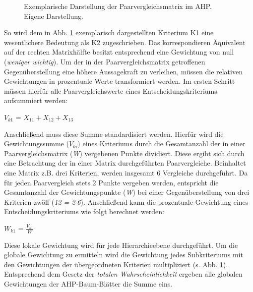 \begin{center}
	\begin{figure}[H]
		\centering
		\caption[Exemplarische Darstellung der Paarvergleichsmatrix im AHP]{Exemplarische Darstellung der Paarvergleichsmatrix im AHP.\\ Eigene Darstellung.}
		\label{fig:AHP_B}
	\end{figure}
\end{center}
\vspace*{-10mm}
So wird dem in Abb. \ref*{fig:AHP_B} exemplarisch dargestellten Kriterium K1 eine wesentlichere Bedeutung als K2 zugeschrieben. Das korrespondieren Äquivalent auf der rechten Matrixhälfte besitzt entsprechend eine Gewichtung von null (\textit{weniger wichtig}). Um der in der Paarvergleichsmatrix getroffenen Gegenüberstellung eine höhere Aussagekraft zu verleihen, müssen die relativen Gewichtungen in prozentuale Werte transformiert werden. Im ersten Schritt müssen hierfür alle Paarvergleichswerte eines Entscheidungskriteriums aufsummiert werden:\\
 \vspace{-6mm}
 \begin{center}
	$V_{k1}$ = $X_{11}+X_{12}+X_{13}$	
 \end{center}
Anschließend muss diese Summe standardisiert werden. Hierfür wird die Gewichtungssumme ($V_{ki}$) eines Kriteriums durch die Gesamtanzahl der in einer Paarvergleichsmatrix (\textit{W}) vergebenen Punkte dividiert. Diese ergibt sich durch eine Betrachtung der in einer Matrix durchgeführten Paarvergleiche. Beinhaltet eine Matrix z.B. drei Kriterien, werden insgesamt 6 Vergleiche durchgeführt. Da für jeden Paarvergleich stets 2 Punkte vergeben werden, entspricht die Gesamtanzahl der Gewichtungspunkte (\textit{W}) bei einer Gegenüberstellung von drei Kriterien zwölf (\textit{12 = 2$\cdot$6}). Anschließend kann die prozentuale Gewichtung eines Entscheidungskriteriums wie folgt berechnet werden:
 \vspace{-8mm}
 \begin{center}
	$W_{k1}$ = $\frac{V_{k1}}{W}$	
 \end{center}
Diese lokale Gewichtung wird für jede Hierarchieebene durchgeführt. Um die globale Gewichtung zu ermitteln wird die Gewichtung jedes Subkriteriums mit den Gewichtungen der übergeordneten Kriterien  multipliziert (s. Abb. \ref*{fig:AHP_B}). Entsprechend dem Gesetz der \textit{totalen Wahrscheinlichkeit} ergeben alle globalen Gewichtungen der AHP-Baum-Blätter die Summe eins. 
